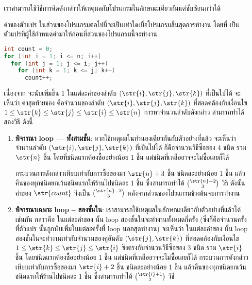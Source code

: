 เราสามารถใช้วิธีการคิดดังกล่าวให้เหตุผลกับโปรแกรมในลักษณะเดียวกันแต่ซับซ้อนกว่าได้
\begin{example}\label{ex:loop3-combi-proof}
ค่าของตัวแปร  ในส่วนของโปรแกรมต่อไปนี้จะเป็นเท่าใดเมื่อโปรแกรมสิ้นสุดการทำงาน โดยที่  เป็นตัวแปรที่ผู้ใช้กำหนดค่ามาให้ก่อนที่ส่วนของโปรแกรมนี้จะทำงาน
\begin{lstlisting}[language=java]
int count = 0;
for (int i = 1; i <= n; i++)
  for (int j = 1; j <= i; j++)
    for (int k = 1; k <= j; k++)
      count++;
\end{lstlisting}

เนื่องจาก  จะนับเพิ่มขึ้น 1 ในแต่ละค่าของลำดับ $(\str{i},\str{j},\str{k})$ ที่เป็นไปได้ จะเห็นว่า ค่าสุดท้ายของ  คือจำนวนของลำดับ $(\str{i},\str{j},\str{k})$ ที่สอดคล้องกับเงื่อนไข $1\leq\str{k}\leq\str{j}\leq\str{i}\leq\str{n}$ \enskip การหาจำนวนลำดับดังกล่าว สามารถทำได้สองวิธี ดังนี้
\begin{enumerate}[]
\item {\bf พิจารณา loop ---- ทั้งสามชั้น}: หากใช้เหตุผลในทำนองเดียวกันกับตัวอย่างที่แล้ว จะเห็นว่า จำนวนลำดับ $(\str{i},\str{j},\str{k})$ ที่เป็นไปได้ ก็คือจำนวนวิธีซื้อของ 4 ชนิด รวม $\str{n}$ ชิ้น โดยที่ชนิดแรกต้องซื้ออย่างน้อย 1 ชิ้น แต่ชนิดที่เหลืออาจจะไม่ซื้อเลยก็ได้

กระบวนการดังกล่าวเทียบเท่ากับการซื้อของมา $\str{n}+3$ ชิ้น ชนิดละอย่างน้อย 1 ชิ้น แล้วคืนของทุกชนิดยกเว้นชนิดแรกให้ร้านไปชนิดละ 1 ชิ้น ซึ่งสามารถทำได้ $\binom{\str{n}-2}{3}$ วิธี \enskip ดังนั้น ค่าของ $\str{count}$ จึงเป็น $\binom{\str{n}-2}{3}$ หลังจากส่วนของโปรแกรมข้างต้นจบการทำงาน

\item {\bf พิจารณาเฉพาะ loop -- สองชั้นใน}: เราสามารถใช้เหตุผลในลักษณะเดียวกับตัวอย่างที่แล้วได้เช่นกัน กล่าวคือ ในแต่ละค่าของ  นั้น loop สองชั้นในจะทำงานทั้งหมดกี่ครั้ง (ซึ่งก็คือจำนวนครั้งที่ตัวแปร  นั้นถูกนับเพิ่มในแต่ละครั้งที่ loop นอกสุดทำงาน) \enskip จะเห็นว่า ในแต่ละค่าของ  นั้น loop สองชั้นในจะทำงานเท่ากับจำนวนของคู่อันดับ $(\str{j},\str{k})$ ที่สอดคล้องกับเงือนไข $1\leq\str{k}\leq\str{j}\leq\str{i}$ ซึ่งตรงกับจำนวนวิธีซื้อของ 3 ชนิด รวม $\str{i}$ ชิ้น โดยชนิดแรกต้องซื้ออย่างน้อย 1 ชิ้น แต่ชนิดที่เหลืออาจจะไม่ซื้อเลยก็ได้ \enskip กระบวนการดังกล่าวเทียบเท่ากับการซื้อของมา $\str{i}+2$ ชิ้น ชนิดละอย่างน้อย 1 ชิ้น แล้วคืนของทุกชนิดยกเว้นชนิดแรกให้ร้านไปชนิดละ 1 ชิ้น ซึ่งสามารถทำได้ $\binom{\str{i}+1}{2}$ วิธี


\end{enumerate}
\end{example}

